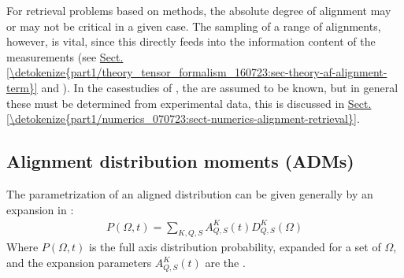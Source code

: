 \documentclass[letterpaper,table,10pt,english]{jupyterBook}
\begin{document}
\sphinxAtStartPar
For {\hyperref[\detokenize{backmatter/glossary:term-radial-matrix-elements}]{}} retrieval problems based on {\hyperref[\detokenize{backmatter/glossary:term-RWP}]{}} methods, the absolute degree of alignment may \sphinxhyphen{} or may not \sphinxhyphen{} be critical in a given case. The sampling of a range of  alignments, however, is vital, since this directly feeds into the information content of the measurements (see \hyperref[\detokenize{part1/theory_tensor_formalism_160723:sec-theory-af-alignment-term}]{Sect.\@ \ref{\detokenize{part1/theory_tensor_formalism_160723:sec-theory-af-alignment-term}}} and ). In the case\sphinxhyphen{}studies of {\hyperref[\detokenize{part2/extracting_matrix_elements_overview_270423:chpt-extracting-matrix-elements-overview}]{}}, the {\hyperref[\detokenize{backmatter/glossary:term-ADMs}]{}} are assumed to be known, but in general these must be determined from experimental data, this is discussed in \hyperref[\detokenize{part1/numerics_070723:sect-numerics-alignment-retrieval}]{Sect.\@ \ref{\detokenize{part1/numerics_070723:sect-numerics-alignment-retrieval}}}.


\subsection{Alignment distribution moments (ADMs)}
\label{\detokenize{part1/theory_molecular_alignment_170723:alignment-distribution-moments-adms}}
\sphinxAtStartPar
The parametrization of an aligned distribution can be given generally by an expansion in {\hyperref[\detokenize{backmatter/glossary:term-Wigner-rotation-matrix-elements}]{}}:
\begin{equation}\label{equation:part1/theory_molecular_alignment_170723:eqn:P-omega-t}
\begin{split} 
P(\Omega,t) = \sum_{K,Q,S} A^K_{Q,S}(t)D^K_{Q,S}(\Omega)
\end{split}
\end{equation}
\sphinxAtStartPar
Where \(P(\Omega,t)\) is the full axis distribution probability, expanded for a set of {\hyperref[\detokenize{backmatter/glossary:term-Euler-angles}]{}} \(\Omega\), and the expansion parameters \(A^K_{Q,S}(t)\) are the {\hyperref[\detokenize{backmatter/glossary:term-ADMs}]{}}.
\end{document}
